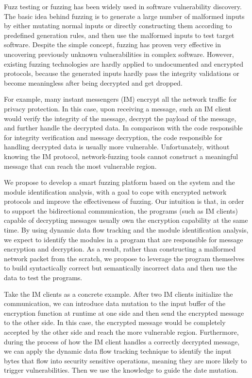 Fuzz testing or fuzzing has been widely used in software vulnerability
discovery. The basic idea behind fuzzing is to generate a large number
of malformed inputs by either mutating normal inputs or directly
constructing them according to predefined generation rules, and then use
the malformed inputs to test target software. Despite the simple
concept, fuzzing has proven very effective in uncovering previously
unknown vulnerabilities in complex software. However, existing fuzzing
technologies are hardly applied to undocumented and encrypted protocols,
because the generated inputs hardly pass the integrity validations or
become meaningless after being decrypted and get dropped.
 
For example, many instant messengers (IM) encrypt all the network
traffic for privacy protection. In this case, upon receiving a message,
such an IM client would verify the integrity of the message, decrypt the
payload of the message, and further handle the decrypted data.  In
comparison with the code responsible for integrity verification and
message decryption, the code responsible for handling decrypted data is
usually more vulnerable. Unfortunately, without knowing the IM protocol,
network-fuzzing tools cannot construct a meaningful message that can
reach the most vulnerable region.
 
We propose to develop a smart fuzzing platform based on the
\dynamicsys system and the module identification analysis, with a goal
to cope with encrypted network protocols and improve the effectiveness
of fuzzing.  Our intuition is that, in order to support the
bidirectional communication, the programs (such as IM clients) capable
of decrypting messages usually own the encryption capability at the same
time.  By using dynamic data flow tracking and the module identification
analysis, we expect to identify the modules in a program that are
responsible for message encryption and decryption. As a result, rather
than constructing a malformed network packet from the scratch, we
propose to leverage the program themselves to build syntactically
correct but semantically incorrect data and then use the data to test
the programs.  
 
Take the IM clients as a concrete example.  After two IM clients
initialize the communication, we can introduce data mutation to the
input buffer of the encryption function at runtime at one side and then
send the encrypted message to the other side. In this case, the
encrypted message would be completely accepted by the other side and
reach the more vulnerable region.  Furthermore, during the process of
how the IM client handles a correctly decrypted message, we can apply
the dynamic data flow tracking technique to identify the input bytes
that flow into security sensitive operations, meaning they are more
likely to trigger vulnerabilities.  Then we use the knowledge to guide
the date mutation.

